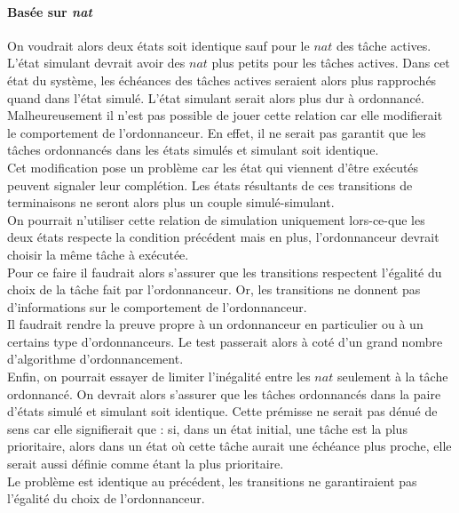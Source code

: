 \documentclass[12pt,a4paper,oneside]{book}
\theoremstyle{break}
\theoremstyle{breakplain}
\begin{document}
\paragraph{Basée sur \textit{nat}}
On voudrait alors deux états soit identique sauf pour le $nat$ des tâche actives. L'état simulant devrait avoir des $nat$ plus petits pour les tâches actives. Dans cet état du système, les échéances des tâches actives seraient alors plus rapprochés quand dans l'état simulé. L'état simulant serait alors plus dur à ordonnancé.\\

Malheureusement il n'est pas possible de jouer cette relation car elle modifierait le comportement de l'ordonnanceur. En effet, il ne serait pas garantit que les tâches ordonnancés dans les états simulés et simulant soit identique.\\
Cet modification pose un problème car les état qui viennent d'être exécutés peuvent signaler leur complétion. Les états résultants de ces transitions de terminaisons ne seront alors plus un couple simulé-simulant.\\

On pourrait n'utiliser cette relation de simulation uniquement lors-ce-que les deux états respecte la condition précédent mais en plus, l'ordonnanceur devrait choisir la même tâche à exécutée.\\
Pour ce faire il faudrait alors s'assurer que les transitions respectent l'égalité du choix de la tâche fait par l'ordonnanceur. Or, les transitions ne donnent pas d'informations sur le comportement de l'ordonnanceur.\\
Il faudrait rendre la preuve propre à un ordonnanceur en particulier ou à un certains type d'ordonnanceurs. Le test passerait alors à coté d'un grand nombre d'algorithme d'ordonnancement.\\

Enfin, on pourrait essayer de limiter l'inégalité entre les $nat$ seulement à la tâche ordonnancé. On devrait alors s'assurer que les tâches ordonnancés dans la paire d'états simulé et simulant soit identique. Cette prémisse ne serait pas dénué de sens car elle signifierait que : si, dans un état initial, une tâche est la plus prioritaire, alors dans un état où cette tâche aurait une échéance plus proche, elle serait aussi définie comme étant la plus prioritaire.\\
Le problème est identique au précédent, les transitions ne garantiraient pas l'égalité du choix de l'ordonnanceur.\\
\end{document}
